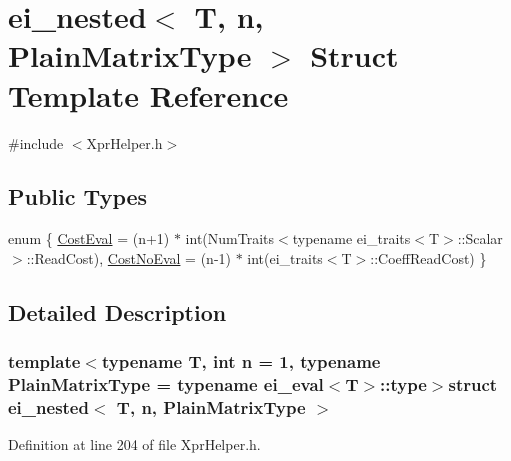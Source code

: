 \hypertarget{structei__nested}{\section{ei\-\_\-nested$<$ T, n, Plain\-Matrix\-Type $>$ Struct Template Reference}
\label{structei__nested}
}


{\ttfamily \#include $<$Xpr\-Helper.\-h$>$}

\subsection*{Public Types}
\begin{DoxyCompactItemize}
\item 
enum \{ \hyperlink{structei__nested_a8da76f8f3a4e163edeb9b0b10fc8b5dcaec244fd3b7aa9674b042735eeecd1b5f}{Cost\-Eval} = (n+1) $\ast$ int(Num\-Traits$<$typename ei\-\_\-traits$<$T$>$\-:\-:Scalar$>$\-:\-:Read\-Cost), 
\hyperlink{structei__nested_a8da76f8f3a4e163edeb9b0b10fc8b5dca058231aeb5e203adb89baae216bd3c6f}{Cost\-No\-Eval} = (n-\/1) $\ast$ int(ei\-\_\-traits$<$T$>$\-:\-:Coeff\-Read\-Cost)
 \}
\end{DoxyCompactItemize}


\subsection{Detailed Description}
\subsubsection*{template$<$typename T, int n = 1, typename Plain\-Matrix\-Type = typename ei\-\_\-eval$<$\-T$>$\-::type$>$struct ei\-\_\-nested$<$ T, n, Plain\-Matrix\-Type $>$}



Definition at line 204 of file Xpr\-Helper.\-h.



